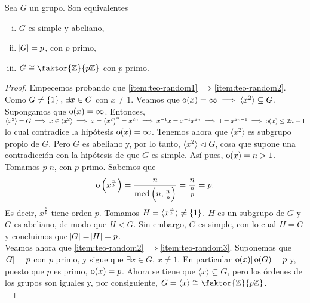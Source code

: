 \begin{teo*}\label{teo:ordprimo}
    Sea $G$ un grupo. Son equivalentes
    \begin{enumerate}[(i)]
        \item\label{item:teo-random1} $G$ es simple y abeliano,
        \item\label{item:teo-random2} $\abs{G} = p$, con $p$ primo,
        \item\label{item:teo-random3} $G \cong \faktor{\z}{p\z}$ con $p$ primo.
    \end{enumerate}
\end{teo*}

\begin{proof}
    Empecemos probando que \ref{item:teo-random1}$\implies$\ref{item:teo-random2}.
    Como $G \neq \left\{1\right\}, \, \exists x \in G$ con $x \neq 1$. Veamos que $\operatorname{o}(x) = \infty \implies
    \langle x^2 \rangle \subsetneq G$. Supongamos que $\operatorname{o}(x) = \infty$. Entonces, $\langle x^2 \rangle = G \implies x \in \langle x^2\rangle
    \implies x = \left( x^2 \right)^n = x^{2n} \implies x^{-1}x = x^{-1}x^{2n} \implies
    1 = x^{2n-1} \implies \operatorname{o}(x) \leq 2n-1$ lo cual contradice la hipótesis $\operatorname{o}(x) = \infty$.
    Tenemos ahora que $\langle x^2 \rangle$ es subgrupo propio de $G$. Pero $G$ es abeliano y, por lo tanto, 
    $\langle x^2 \rangle \triangleleft G$, cosa que supone una contradicción con la hipótesis de que $G$ es simple.
    Así pues, $\operatorname{o}(x) = n > 1$. 
    Tomamos $p \vert n$, con $p$ primo. Sabemos que
    \[
        \operatorname{o}\left( x^{\frac{n}{p}} \right) = \frac{n}{\operatorname{mcd}\left(n, \frac{n}{p}\right)} =
        \frac{n}{\frac{n}{p}} = p.
    \]
    Es decir, $x^{\frac{n}{p}}$ tiene orden $p$. Tomamos $H = \langle x^{\frac{n}{p}}\rangle \neq \left\{1\right\}$.
    $H$ es un subgrupo de $G$ y $G$ es abeliano, de modo que $H \triangleleft G$. Sin embargo, $G$ es simple,
    con lo cual $H = G$ y concluimos que $\abs{G} = \abs{H} = p$.
    \\
    
    \noindent Veamos ahora que \ref{item:teo-random2}$\implies$\ref{item:teo-random3}. Suponemos que $\abs{G} = p$
    con $p$ primo, y sigue que $\exists x \in G, \, x \neq 1$. En particular $\operatorname{o}(x) \vert \operatorname{o}(G) = p$ 
    y, puesto que $p$ es primo, $\operatorname{o}(x) = p$. Ahora se tiene que $\langle x\rangle \subseteq G$, pero los órdenes
    de los grupos son iguales y, por consiguiente, $G = \langle x\rangle \cong \faktor{\z}{p\z}$.
    \\
    

\end{proof}
